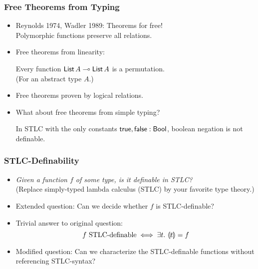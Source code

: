 \documentclass[t,fleqn,usenames,dvipsnames]{beamer}
\newcommand{\cAnn}{\color{red!80!black}}%
\renewcommand{\emph}[1]{{\cAnn#1}}
\newcommand{\cType}{\color{orange!60!black}}
\renewcommand{\emph}[1]{\textit{\cType#1}}
\newcommand{\lolli}{\multimap}
\begin{document}
\begin{frame}%
  \frametitle{Free Theorems from Typing}
  \vspace{-3ex}
  \begin{itemize}
  \item Reynolds 1974, Wadler 1989: Theorems for free! \\
    Polymorphic functions preserve all relations.
  \item Free theorems from linearity: %
    \begin{theorem}
     Every function $\List\,A \lolli \List\,A$ is a permutation. \\
     (For an abstract type $A$.)
    \end{theorem}
  \item Free theorems proven by logical relations.
  \item What about free theorems from simple typing? %
    \begin{theorem}
     In STLC with the only constants $\mathsf{true}, \mathsf{false} : \mathsf{Bool}$,
     boolean negation is not definable.
    \end{theorem}
  \end{itemize}
\end{frame}

\begin{frame}%
  \frametitle{STLC-Definability}
  \begin{itemize}
  \item \emph{Given a function $f$ of some type, is it definable in STLC?} \\
   (Replace simply-typed lambda calculus (STLC) by your favorite
    type theory.)
  \item Extended question: Can we decide whether $f$ is STLC-definable?
  \item Trivial answer to original question:
\[
  f \mbox{ STLC-definable} \iff \exists t.\ \llparenthesis t\rrparenthesis = f
\]
\vspace{-2ex}
  \item Modified question: Can we characterize the STLC-definable
    functions without referencing STLC-syntax?
  \end{itemize}
\end{frame}
\end{document}
